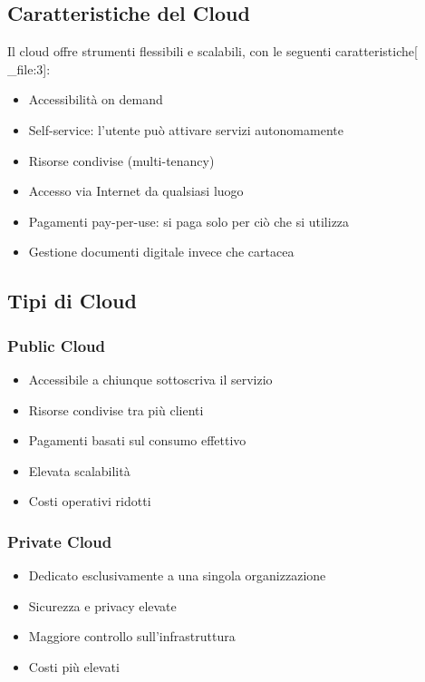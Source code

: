 \documentclass[12pt,a4paper]{article}
\begin{document}
\subsection{Caratteristiche del Cloud}
Il cloud offre strumenti flessibili e scalabili, con le seguenti caratteristiche[ _file:3]:
\begin{itemize}
    \item Accessibilità on demand
    \item Self-service: l'utente può attivare servizi autonomamente
    \item Risorse condivise (multi-tenancy)
    \item Accesso via Internet da qualsiasi luogo
    \item Pagamenti pay-per-use: si paga solo per ciò che si utilizza
    \item Gestione documenti digitale invece che cartacea
\end{itemize}

\subsection{Tipi di Cloud}

\subsubsection{Public Cloud}
\begin{itemize}
    \item Accessibile a chiunque sottoscriva il servizio
    \item Risorse condivise tra più clienti
    \item Pagamenti basati sul consumo effettivo
    \item Elevata scalabilità
    \item Costi operativi ridotti
\end{itemize}

\subsubsection{Private Cloud}
\begin{itemize}
    \item Dedicato esclusivamente a una singola organizzazione
    \item Sicurezza e privacy elevate
    \item Maggiore controllo sull'infrastruttura
    \item Costi più elevati
\end{itemize}
\end{document}
